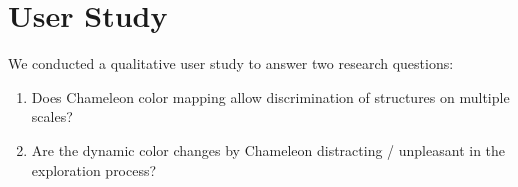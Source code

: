 \documentclass{egpubl}
\begin{document}
	
	\section{User Study}
	\label{sec:study}
	We conducted a qualitative user study to answer two research questions: 
	\begin{enumerate}
		\item Does Chameleon color mapping allow discrimination of structures on multiple scales? 
		\item Are the dynamic color changes by Chameleon distracting / unpleasant in the exploration process? 
	\end{enumerate}
	
\end{document}

